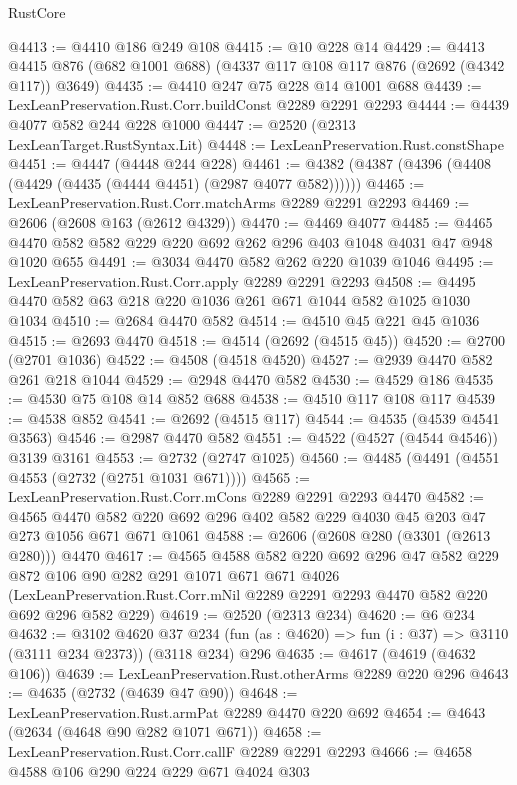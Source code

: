 \begin{lexlean}{RustCore}
\begin{coremodule}
@4413 := @4410 @186 @249 @108
@4415 := @10 @228 @14
@4429 := @4413 @4415 @876 (@682 @1001 @688) (@4337 @117 @108 @117 @876 (@2692 (@4342 @117)) @3649)
@4435 := @4410 @247 @75 @228 @14 @1001 @688
@4439 := LexLeanPreservation.Rust.Corr.buildConst @2289 @2291 @2293
@4444 := @4439 @4077 @582 @244 @228 @1000
@4447 := @2520 (@2313 LexLeanTarget.RustSyntax.Lit)
@4448 := LexLeanPreservation.Rust.constShape
@4451 := @4447 (@4448 @244 @228)
@4461 := @4382 (@4387 (@4396 (@4408 (@4429 (@4435 (@4444 @4451) (@2987 @4077 @582))))))
@4465 := LexLeanPreservation.Rust.Corr.matchArms @2289 @2291 @2293
@4469 := @2606 (@2608 @163 (@2612 @4329))
@4470 := @4469 @4077
@4485 := @4465 @4470 @582 @582 @229 @220 @692 @262 @296 @403 @1048 @4031 @47 @948 @1020 @655
@4491 := @3034 @4470 @582 @262 @220 @1039 @1046
@4495 := LexLeanPreservation.Rust.Corr.apply @2289 @2291 @2293
@4508 := @4495 @4470 @582 @63 @218 @220 @1036 @261 @671 @1044 @582 @1025 @1030 @1034
@4510 := @2684 @4470 @582
@4514 := @4510 @45 @221 @45 @1036
@4515 := @2693 @4470
@4518 := @4514 (@2692 (@4515 @45))
@4520 := @2700 (@2701 @1036)
@4522 := @4508 (@4518 @4520)
@4527 := @2939 @4470 @582 @261 @218 @1044
@4529 := @2948 @4470 @582
@4530 := @4529 @186
@4535 := @4530 @75 @108 @14 @852 @688
@4538 := @4510 @117 @108 @117
@4539 := @4538 @852
@4541 := @2692 (@4515 @117)
@4544 := @4535 (@4539 @4541 @3563)
@4546 := @2987 @4470 @582
@4551 := @4522 (@4527 (@4544 @4546)) @3139 @3161
@4553 := @2732 (@2747 @1025)
@4560 := @4485 (@4491 (@4551 @4553 (@2732 (@2751 @1031 @671))))
@4565 := LexLeanPreservation.Rust.Corr.mCons @2289 @2291 @2293 @4470
@4582 := @4565
    @4470
    @582
    @220
    @692
    @296
    @402
    @582
    @229
    @4030
    @45
    @203
    @47
    @273
    @1056
    @671
    @671
    @1061
@4588 := @2606 (@2608 @280 (@3301 (@2613 @280))) @4470
@4617 := @4565
    @4588
    @582
    @220
    @692
    @296
    @47
    @582
    @229
    @872
    @106
    @90
    @282
    @291
    @1071
    @671
    @671
    @4026
    (LexLeanPreservation.Rust.Corr.mNil @2289 @2291 @2293 @4470 @582 @220 @692 @296 @582 @229)
@4619 := @2520 (@2313 @234)
@4620 := @6 @234
@4632 := @3102
    @4620
    @37
    @234
    (fun (as : @4620) => fun (i : @37) => @3110 (@3111 @234 @2373))
    (@3118 @234)
    @296
@4635 := @4617 (@4619 (@4632 @106))
@4639 := LexLeanPreservation.Rust.otherArms @2289 @220 @296
@4643 := @4635 (@2732 (@4639 @47 @90))
@4648 := LexLeanPreservation.Rust.armPat @2289 @4470 @220 @692
@4654 := @4643 (@2634 (@4648 @90 @282 @1071 @671))
@4658 := LexLeanPreservation.Rust.Corr.callF @2289 @2291 @2293
@4666 := @4658 @4588 @106 @290 @224 @229 @671 @4024 @303

\end{coremodule}
\end{lexlean}
